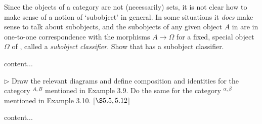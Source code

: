 \begin{exercise}
	Since the objects of a category  are not (necessarily) sets, it is not clear how to make sense of a notion of ‘subobject’ in general. In some situations it \textit{does} make sense to talk about subobjects, and the subobjects of any given object \(A\) in  are in one-to-one correspondence with the morphisms \(A \to \Omega\) for a fixed, special object \(\Omega\) of , called a \textit{subobject classifier}. Show that  has a subobject classifier.
\end{exercise}
\begin{solution}
	content...
\end{solution}

\begin{exercise}
	\(\triangleright\) Draw the relevant diagrams and define composition and identities for the category \(^{A,B}\) mentioned in Example 3.9. Do the same for the category \(^{\alpha,\beta}\) mentioned in Example 3.10. [\(\S 5.5, 5.12\)]
\end{exercise}
\begin{solution}
	content...
\end{solution}